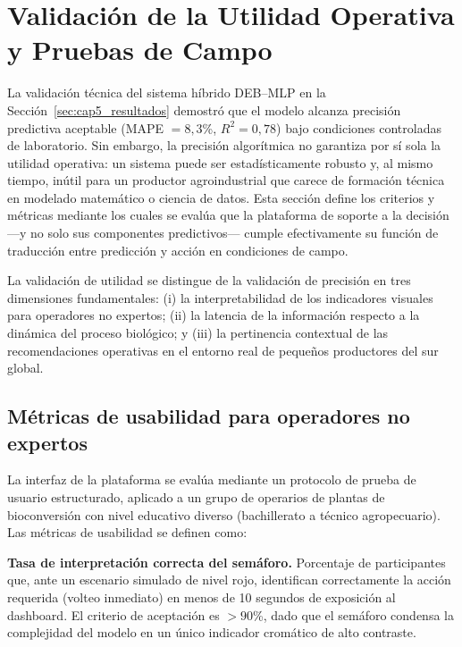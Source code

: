\section{Validación de la Utilidad Operativa y Pruebas de Campo}
\label{sec:cap5_utilidad}

La validación técnica del sistema híbrido DEB--MLP en la Sección~\ref{sec:cap5_resultados} demostró que el modelo alcanza precisión predictiva aceptable (MAPE $= 8{,}3$\%, $R^2 = 0{,}78$) bajo condiciones controladas de laboratorio. Sin embargo, la precisión algorítmica no garantiza por sí sola la utilidad operativa: un sistema puede ser estadísticamente robusto y, al mismo tiempo, inútil para un productor agroindustrial que carece de formación técnica en modelado matemático o ciencia de datos. Esta sección define los criterios y métricas mediante los cuales se evalúa que la plataforma de soporte a la decisión ---y no solo sus componentes predictivos--- cumple efectivamente su función de traducción entre predicción y acción en condiciones de campo.

La validación de utilidad se distingue de la validación de precisión en tres dimensiones fundamentales: (i) la interpretabilidad de los indicadores visuales para operadores no expertos; (ii) la latencia de la información respecto a la dinámica del proceso biológico; y (iii) la pertinencia contextual de las recomendaciones operativas en el entorno real de pequeños productores del sur global.

\subsection{Métricas de usabilidad para operadores no expertos}
\label{subsec:cap5_usabilidad}

La interfaz de la plataforma se evalúa mediante un protocolo de prueba de usuario estructurado, aplicado a un grupo de operarios de plantas de bioconversión con nivel educativo diverso (bachillerato a técnico agropecuario). Las métricas de usabilidad se definen como:

\textbf{Tasa de interpretación correcta del semáforo.} Porcentaje de participantes que, ante un escenario simulado de nivel rojo, identifican correctamente la acción requerida (volteo inmediato) en menos de 10 segundos de exposición al dashboard. El criterio de aceptación es $> 90$\%, dado que el semáforo condensa la complejidad del modelo en un único indicador cromático de alto contraste.

